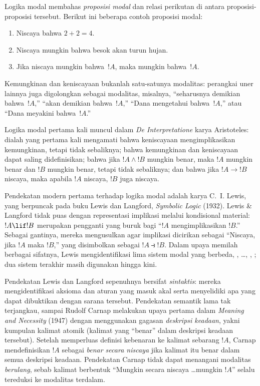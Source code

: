 \documentclass[../../../include/open-logic-section]{subfiles}
\begin{document}


Logika modal membahas \emph{proposisi modal} dan relasi perikutan di antara
proposisi-proposisi tersebut. Berikut ini beberapa contoh proposisi modal:
\begin{enumerate}
\item Niscaya bahwa $2+2=4$.
\item Niscaya mungkin bahwa besok akan turun hujan.
\item Jika niscaya mungkin bahwa~$!A$, maka mungkin bahwa~$!A$.
\end{enumerate}
Kemungkinan dan keniscayaan bukanlah satu-satunya modalitas: perangkai uner
lainnya juga digolongkan sebagai modalitas, misalnya, ``seharusnya demikian
bahwa~$!A$,'' ``akan demikian bahwa~$!A$,'' ``Dana mengetahui bahwa~$!A$,''
atau ``Dana meyakini bahwa~$!A$.''

Logika modal pertama kali muncul dalam \emph{De Interpretatione} karya
Aristoteles: dialah yang pertama kali mengamati bahwa keniscayaan
mengimplikasikan kemungkinan, tetapi tidak sebaliknya; bahwa kemungkinan dan
keniscayaan dapat saling didefinisikan; bahwa jika $!A \land !B$ mungkin
benar, maka $!A$ mungkin benar dan $!B$ mungkin benar, tetapi tidak
sebaliknya; dan bahwa jika $!A \to !B$ niscaya, maka apabila $!A$ niscaya,
$!B$ juga niscaya.

Pendekatan modern pertama terhadap logika modal adalah karya C.~I. Lewis,
yang berpuncak pada buku Lewis dan Langford, \emph{Symbolic Logic}
(1932). Lewis \& Langford tidak puas dengan representasi implikasi melalui
kondisional material: $!A \lif !B$ merupakan pengganti yang buruk bagi
``$!A$ mengimplikasikan $!B$.'' Sebagai gantinya, mereka mengusulkan agar
implikasi dicirikan sebagai ``Niscaya, jika $!A$ maka $!B$,'' yang
disimbolkan sebagai $!A \strictif !B$. Dalam upaya memilah berbagai
sifatnya, Lewis mengidentifikasi lima sistem modal yang berbeda, ,
\ldots, , ; dua sistem terakhir masih digunakan hingga kini.

Pendekatan Lewis dan Langford sepenuhnya bersifat \emph{sintaktis}: mereka
mengidentifikasi aksioma dan aturan yang masuk akal serta menyelidiki apa yang
dapat dibuktikan dengan sarana tersebut. Pendekatan semantik lama tak
terjangkau, sampai Rudolf Carnap melakukan upaya pertama dalam \emph{Meaning
  and Necessity} (1947) dengan menggunakan gagasan \emph{deskripsi keadaan},
yakni kumpulan kalimat atomik (kalimat yang ``benar'' dalam deskripsi keadaan
tersebut). Setelah memperluas definisi kebenaran ke kalimat sebarang $!A$,
Carnap mendefinisikan $!A$ sebagai \emph{benar secara niscaya} jika kalimat
itu benar dalam semua deskripsi keadaan. Pendekatan Carnap tidak dapat
menangani modalitas \emph{berulang}, sebab kalimat berbentuk ``Mungkin secara
niscaya \ldots mungkin $!A$'' selalu tereduksi ke modalitas terdalam.
\end{document}
